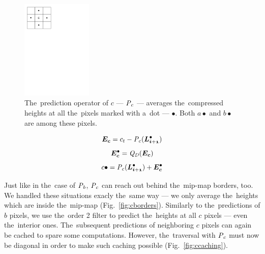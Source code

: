 \begin{figure}
	\includegraphics[trim={0 21cm 10cm 0}, clip, width=0.3\textwidth]{figures/ccomp.pdf}\centering
	\caption{The~prediction operator of $c$ --- $\mathit{P_{c}}$ --- averages the~compressed heights at all the~pixels marked with a~dot --- $\bullet$. Both $a\bullet$ and $b\bullet$ are among these pixels.}
	\label{fig:ccomp}
\end{figure}

$$\objnorm{E}{c} = c_t - \opnorm{P}{c}(\ldot{i+1})$$
$$\objdot{E}{c} = \opnorm{Q}{D}(\objnorm{E}{c})$$
\begin{equation}
\label{eq:c}
c\bullet = \opnorm{P}{c}(\ldot{i+1}) + \objdot{E}{c}
\end{equation}

Just like in the~case of $\mathit{P_{b}}$, $\mathit{P_{c}}$ can reach out behind the~mip-map borders, too. We handled these situations exacly the~same way --- we only average the~heights which are inside the~mip-map (Fig.~\ref{fig:cborders}). Similarly to the~predictions of $b$ pixels, we use the~order 2 filter to predict the~heights at all $c$ pixels --- even the~interior ones. The~subsequent predictions of neighboring $c$ pixels can again be cached to spare some computations. However, the~traversal with $\mathit{P_{c}}$ must now be diagonal in order to make such caching possible (Fig.~\ref{fig:ccaching}).

